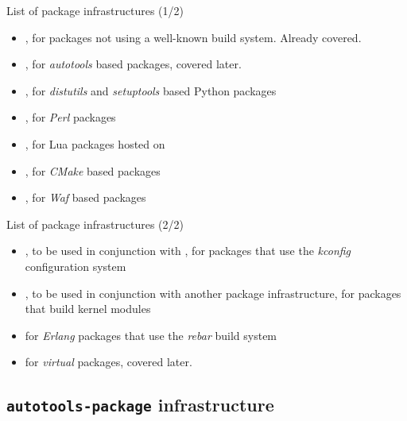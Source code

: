 \begin{frame}{List of package infrastructures (1/2)}
  \begin{itemize}
  \item {}, for packages not using a well-known
    build system. Already covered.
  \item {}, for {\em autotools} based packages,
    covered later.
  \item {}, for {\em distutils} and {\em
      setuptools} based Python packages
  \item {}, for {\em Perl} packages
  \item {}, for Lua packages hosted on
  \item {}, for {\em CMake} based packages
  \item {}, for {\em Waf} based packages
  \end{itemize}
\end{frame}

\begin{frame}{List of package infrastructures (2/2)}
  \begin{itemize}
  \item {}, to be used in conjunction with
    , for packages that use the {\em kconfig}
    configuration system
  \item {}, to be used in conjunction with
    another package infrastructure, for packages that build kernel
    modules
  \item {} for {\em Erlang} packages that use the
    {\em rebar} build system
  \item {} for {\em virtual} packages, covered
    later.
  \end{itemize}
\end{frame}

\subsection{{\tt autotools-package} infrastructure}


